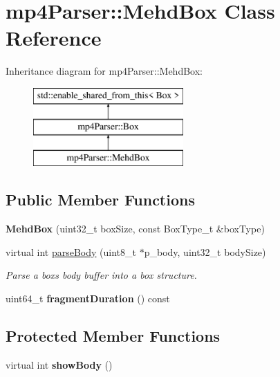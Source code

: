 \hypertarget{classmp4_parser_1_1_mehd_box}{}\section{mp4\+Parser\+::Mehd\+Box Class Reference}
\label{classmp4_parser_1_1_mehd_box}
Inheritance diagram for mp4\+Parser\+::Mehd\+Box\+:\begin{figure}[H]
\begin{center}
\leavevmode
\includegraphics[height=3.000000cm]{classmp4_parser_1_1_mehd_box}
\end{center}
\end{figure}
\subsection*{Public Member Functions}
\begin{DoxyCompactItemize}
\item 
\mbox{\label{classmp4_parser_1_1_mehd_box_a5aebbf0135ba80054d88d4fd9ac47280}} 
{\bfseries Mehd\+Box} (uint32\+\_\+t box\+Size, const Box\+Type\+\_\+t \&box\+Type)
\item 
virtual int \mbox{\hyperlink{classmp4_parser_1_1_mehd_box_aa63f552035700d1159607d7285e494b1}{parse\+Body}} (uint8\+\_\+t $\ast$p\+\_\+body, uint32\+\_\+t body\+Size)
\begin{DoxyCompactList}\small\item\em Parse a box\textquotesingle{}s body buffer into a box structure. \end{DoxyCompactList}\item 
\mbox{\label{classmp4_parser_1_1_mehd_box_a0a21c3dc315174d209ba603860846d2f}} 
uint64\+\_\+t {\bfseries fragment\+Duration} () const
\end{DoxyCompactItemize}
\subsection*{Protected Member Functions}
\begin{DoxyCompactItemize}
\item 
\mbox{\label{classmp4_parser_1_1_mehd_box_abfd15223faac40aef79e6ff743833c0c}} 
virtual int {\bfseries show\+Body} ()
\end{DoxyCompactItemize}
